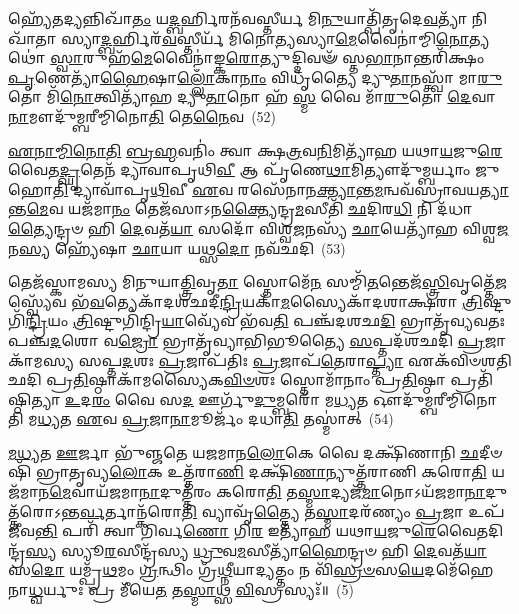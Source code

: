 𑌹𑍍𑌯𑍇᳴𑌤𑌦𑍍𑌯𑌨𑍍𑌨𑌿𑌖𑌾᳴\-\ul{𑌤𑌂} 𑌯\-\ul{𑌦𑍍𑌬}\-𑌰𑍍\mbox{}𑌹𑌿𑌰𑌨᳴𑌵𑌸𑍍𑌤𑍀𑌰𑍍𑌯 𑌮𑌿\-\ul{𑌨𑍁}\-𑌯𑌾𑌤𑍍𑌪𑌿᳴𑌤𑍃𑌦𑍇\-\ul{𑌵}\-𑌤𑍍𑌯𑌾᳴ 𑌨𑌿𑌖𑌾᳴𑌤𑌾 𑌸𑍍𑌯𑌾\-\ul{𑌦𑍍𑌬}\-𑌰𑍍\mbox{}𑌹𑌿𑌰᳴\-\ul{𑌵}\-𑌸𑍍𑌤𑍀𑌰𑍍𑌯᳴ 𑌮𑌿𑌨𑍋\-\ul{𑌤𑍍𑌯}\-𑌸𑍍𑌯𑌾\-\ul{𑌮𑍇}\-𑌵𑍈𑌨𑌾॑𑌮𑍍𑌮𑌿\-\ul{𑌨𑍋}\-𑌤𑍍𑌯𑌥𑍋॑ \ul{𑌸𑍍𑌵𑌾}\-𑌰𑍁𑌹᳴\-\ul{𑌮𑍇}\-𑌵𑍈𑌨𑌾॑𑌙𑍍𑌕\-\ul{𑌰𑍋}\-𑌤𑍍𑌯𑍁𑌦𑍍𑌦𑌿𑌵𑍟᳴ 𑌸𑍍𑌤\-\ul{𑌭𑌾}\-𑌨𑌾𑌨𑍍𑌤𑌰𑌿᳴𑌕𑍍𑌷𑌂 \ul{𑌪𑍃}\-𑌣𑍇𑌤𑍍𑌯𑌾᳴\-\ul{𑌹𑍈}\-𑌷𑌾\-\ul{𑌲𑍍𑌲𑍋𑌁}\-𑌕𑌾\-\ul{𑌨𑌾𑌂} 𑌵𑌿𑌧𑍃᳴𑌤𑍍𑌯𑍈 𑌦𑍍𑌯𑍁\-\ul{𑌤𑌾}\-𑌨𑌸𑍍𑌤𑍍𑌵𑌾᳴ 𑌮𑌾\-\ul{𑌰𑍁}\-𑌤𑍋 𑌮𑌿᳴\-\ul{𑌨𑍋}\-𑌤𑍍𑌵𑌿𑌤𑍍𑌯𑌾᳴𑌹 𑌦𑍍𑌯𑍁\-\ul{𑌤𑌾}\-𑌨𑍋 𑌹᳴ \ul{𑌸𑍍𑌮} 𑌵𑍈 𑌮𑌾᳴\-\ul{𑌰𑍁}\-𑌤𑍋 \ul{𑌦𑍇}\-𑌵𑌾\-\ul{𑌨𑌾}\-𑌮𑍗𑌦𑍁᳴𑌮𑍍𑌬𑌰𑍀𑌮𑍍𑌮𑌿𑌨𑍋\-\ul{𑌤𑌿} 𑌤𑍇\-\ul{𑌨𑍈}\-𑌵~(52)

\-\ul{𑌏}\-\-\ul{𑌨𑌾}\-\-\ul{𑌮𑍍𑌮𑌿}\-\-\ul{𑌨𑍋}\-\-\ul{𑌤𑌿} \ul{𑌬𑍍𑌰}\-\-\ul{𑌹𑍍𑌮}\-𑌵𑌨𑌿𑌂॑ 𑌤𑍍𑌵𑌾 𑌕𑍍𑌷\-\ul{𑌤𑍍𑌰}\-𑌵\-\ul{𑌨𑌿}\-𑌮𑌿𑌤𑍍𑌯𑌾᳴𑌹 𑌯𑌥𑌾\-\ul{𑌯}\-𑌜𑍁\-\ul{𑌰𑍇}\-𑌵𑍈𑌤\-\ul{𑌦𑍍𑌘𑍃}\-𑌤𑍇𑌨᳴ 𑌦𑍍𑌯𑌾𑌵𑌾𑌪𑍃𑌥𑌿\-\ul{𑌵𑍀} 𑌆 𑌪𑍃᳴𑌣𑍇\-\ul{𑌥𑌾}\-𑌮𑌿𑌤𑍍𑌯𑍗𑌦𑍁᳴𑌮𑍍𑌬𑌰𑍍𑌯𑌾𑌂 𑌜𑍁𑌹𑍋\-\ul{𑌤𑌿} 𑌦𑍍𑌯𑌾𑌵𑌾᳴𑌪𑍃\-\ul{𑌥𑌿}\-𑌵𑍀 \ul{𑌏}\-𑌵 𑌰𑌸𑍇᳴𑌨𑌾𑌨\-\ul{𑌕𑍍𑌤𑍍𑌯𑌾}\-𑌨𑍍𑌤\-\ul{𑌮}\-𑌨𑍍𑌵𑌵᳴𑌸𑍍𑌰𑌾𑌵𑌯\-\ul{𑌤𑍍𑌯𑌾}\-𑌨𑍍𑌤\-\ul{𑌮𑍇}\-𑌵 𑌯𑌜᳴𑌮𑌾\-\ul{𑌨𑌂} 𑌤𑍇𑌜᳴𑌸𑌾\-𑌽𑌨\-\ul{𑌕𑍍𑌤𑍍𑌯𑍈}\-𑌨𑍍𑌦𑍍𑌰\-\ul{𑌮}\-𑌸𑍀𑌤𑌿᳴ \ul{𑌛}\-𑌦𑌿𑌰\-\ul{𑌧𑌿} 𑌨𑌿 𑌦᳴𑌧𑌾\-\ul{𑌤𑍍𑌯𑍈}\-𑌨𑍍𑌦𑍍𑌰𑍞 𑌹𑌿 \ul{𑌦𑍇}\-𑌵𑌤᳴\-\ul{𑌯𑌾} 𑌸𑌦𑍋᳴ 𑌵𑌿𑌶𑍍𑌵\-\ul{𑌜}\-𑌨𑌸𑍍𑌯᳴ \ul{𑌛𑌾}\-𑌯𑍇𑌤𑍍𑌯𑌾᳴𑌹 𑌵𑌿𑌶𑍍𑌵\-\ul{𑌜}\-𑌨\-\ul{𑌸𑍍𑌯} 𑌹𑍍𑌯𑍇᳴𑌷𑌾 \ul{𑌛𑌾}\-𑌯𑌾 𑌯𑌥𑍍𑌸\-\ul{𑌦𑍋} 𑌨𑌵᳴𑌛𑌦𑌿~(53)

𑌤𑍇𑌜᳴𑌸𑍍𑌕𑌾𑌮𑌸𑍍𑌯 𑌮𑌿𑌨𑍁𑌯𑌾\-\ul{𑌤𑍍𑌤𑍍𑌰𑌿}\-𑌵𑍃\-\ul{𑌤𑌾} 𑌸𑍍𑌤𑍋𑌮𑍇᳴\-\ul{𑌨} 𑌸𑌮𑍍𑌮𑌿᳴\-\ul{𑌤}\-𑌨𑍍𑌤𑍇𑌜᳴\-\ul{𑌸𑍍𑌤𑍍𑌰𑌿}\-𑌵𑍃𑌤𑍍𑌤𑍇᳴\-\ul{𑌜}\-𑌸𑍍𑌵𑍍𑌯𑍇᳴𑌵 𑌭᳴\-\ul{𑌵}\-𑌤𑍍𑌯𑍇𑌕𑌾᳴\-𑌦𑌶𑌛𑌦𑍀\-\ul{𑌨𑍍𑌦𑍍𑌰𑌿}\-𑌯𑌕𑌾᳴\-\ul{𑌮}\-𑌸𑍍𑌯𑍈𑌕𑌾᳴\-𑌦𑌶𑌾𑌕𑍍𑌷𑌰𑌾 \ul{𑌤𑍍𑌰𑌿}\-𑌷𑍍𑌟𑍁𑌗𑌿᳴\-\ul{𑌨𑍍𑌦𑍍𑌰𑌿}\-𑌯𑌂 \ul{𑌤𑍍𑌰𑌿}\-𑌷𑍍𑌟𑍁𑌗𑌿᳴𑌨𑍍𑌦𑍍𑌰𑌿\-\ul{𑌯𑌾}\-𑌵𑍍𑌯𑍇᳴𑌵 𑌭᳴𑌵\-\ul{𑌤𑌿} 𑌪𑌞𑍍𑌚᳴𑌦𑌶𑌛\-\ul{𑌦𑌿} 𑌭𑍍𑌰𑌾𑌤𑍃᳴𑌵𑍍𑌯𑌵𑌤𑌃 𑌪𑌞𑍍𑌚\-\ul{𑌦}\-𑌶𑍋 𑌵\-\ul{𑌜𑍍𑌰𑍋} 𑌭𑍍𑌰𑌾𑌤𑍃᳴𑌵𑍍𑌯𑌾𑌭𑌿𑌭𑍂𑌤𑍍𑌯𑍈 \ul{𑌸}\-𑌪𑍍𑌤𑌦᳴𑌶𑌛𑌦𑌿 \ul{𑌪𑍍𑌰}\-𑌜𑌾𑌕𑌾᳴𑌮𑌸𑍍𑌯 𑌸𑌪𑍍𑌤\-\ul{𑌦}\-𑌶𑌃 \ul{𑌪𑍍𑌰}\-𑌜𑌾𑌪᳴𑌤𑌿𑌃 \ul{𑌪𑍍𑌰}\-𑌜𑌾𑌪᳴\-\ul{𑌤𑍇}\-𑌰𑌾\-\ul{𑌪𑍍𑌤𑍍𑌯𑌾} 𑌏𑌕᳴𑌵𑌿𑍞𑌶𑌤𑌿𑌛𑌦𑌿 𑌪𑍍𑌰\-\ul{𑌤𑌿}\-𑌷𑍍𑌠𑌾𑌕𑌾᳴𑌮𑌸𑍍𑌯𑍈𑌕\-\ul{𑌵𑌿}\-\-\ul{𑍞}\-𑌶𑌃 𑌸𑍍𑌤𑍋𑌮𑌾᳴𑌨𑌾𑌂 𑌪𑍍𑌰\-\ul{𑌤𑌿}\-𑌷𑍍𑌠𑌾 𑌪𑍍𑌰𑌤𑌿᳴𑌷𑍍𑌠𑌿𑌤𑍍𑌯𑌾 \ul{𑌉}\-𑌦\-\ul{𑌰𑌂} 𑌵𑍈 𑌸\-\ul{𑌦} 𑌊𑌰𑍍𑌗𑍁᳴\-\ul{𑌦𑍁}\-𑌮𑍍𑌬𑌰𑍋᳴ 𑌮\-\ul{𑌧𑍍𑌯}\-𑌤 𑌔𑌦𑍁᳴𑌮𑍍𑌬𑌰𑍀𑌮𑍍𑌮𑌿𑌨𑍋𑌤𑌿 𑌮\-\ul{𑌧𑍍𑌯}\-𑌤 \ul{𑌏}\-𑌵 \ul{𑌪𑍍𑌰}\-𑌜𑌾\-\ul{𑌨𑌾}\-𑌮𑍂𑌰𑍍𑌜𑌂᳴ 𑌦𑌧𑌾\-\ul{𑌤𑌿} 𑌤𑌸𑍍𑌮𑌾॑𑌤𑍍~(54)

\-\ul{𑌮}\-\-\ul{𑌧𑍍𑌯}\-𑌤 \ul{𑌊}\-𑌰𑍍𑌜𑌾 𑌭𑍁᳴𑌞𑍍𑌜𑌤𑍇 𑌯𑌜𑌮𑌾𑌨\-\ul{𑌲𑍋}\-𑌕𑍇 𑌵𑍈 𑌦𑌕𑍍𑌷𑌿᳴𑌣𑌾𑌨𑌿 \ul{𑌛}\-𑌦𑍀𑍞𑌷𑌿᳴ 𑌭𑍍𑌰𑌾𑌤𑍃𑌵𑍍𑌯\-\ul{𑌲𑍋}\-𑌕 𑌉𑌤𑍍𑌤᳴𑌰𑌾\-\ul{𑌣𑌿} 𑌦𑌕𑍍𑌷𑌿᳴\-\ul{𑌣𑌾}\-𑌨𑍍𑌯𑍁𑌤𑍍𑌤᳴𑌰𑌾𑌣𑌿 𑌕𑌰𑍋\-\ul{𑌤𑌿} 𑌯𑌜᳴𑌮𑌾𑌨\-\ul{𑌮𑍇}\-𑌵𑌾𑌯᳴𑌜𑌮𑌾\-\ul{𑌨𑌾}\-𑌦𑍁𑌤𑍍𑌤᳴𑌰𑌂 𑌕𑌰𑍋\-\ul{𑌤𑌿} 𑌤\-\ul{𑌸𑍍𑌮𑌾}\-𑌦𑍍𑌯𑌜᳴\-\ul{𑌮𑌾}\-𑌨𑍋\-𑌽𑌯᳴𑌜𑌮𑌾\-\ul{𑌨𑌾}\-𑌦𑍁𑌤𑍍𑌤᳴𑌰𑍋\-𑌽𑌨𑍍𑌤\-\ul{𑌰𑍍𑌵}\-𑌰𑍍𑌤𑌾𑌨𑍍𑌕᳴𑌰𑍋\-\ul{𑌤𑌿} 𑌵𑍍𑌯𑌾𑌵𑍃᳴\-\ul{𑌤𑍍𑌤𑍍𑌯𑍈} 𑌤\-\ul{𑌸𑍍𑌮𑌾}\-𑌦𑌰᳴𑌣𑍍𑌯𑌂 \ul{𑌪𑍍𑌰}\-𑌜𑌾 𑌉𑌪᳴ 𑌜𑍀𑌵\-\ul{𑌨𑍍𑌤𑌿} 𑌪𑌰𑌿᳴ 𑌤𑍍𑌵𑌾 𑌗𑌿𑌰𑍍𑌵\-\ul{𑌣𑍋} 𑌗𑌿\-\ul{𑌰} 𑌇𑌤𑍍𑌯𑌾᳴𑌹 𑌯𑌥𑌾\-\ul{𑌯}\-𑌜𑍁\-\ul{𑌰𑍇}\-𑌵𑍈𑌤𑌦𑌿𑌨𑍍𑌦𑍍𑌰᳴\-\ul{𑌸𑍍𑌯} 𑌸𑍍𑌯𑍂\-\ul{𑌰}\-𑌸𑍀𑌨𑍍𑌦𑍍𑌰᳴𑌸𑍍𑌯 \ul{𑌧𑍍𑌰𑍁}\-𑌵\-\ul{𑌮}\-𑌸𑍀𑌤𑍍𑌯𑌾᳴\-\ul{𑌹𑍈}\-𑌨𑍍𑌦𑍍𑌰𑍞 𑌹𑌿 \ul{𑌦𑍇}\-𑌵𑌤᳴\-\ul{𑌯𑌾} 𑌸\-\ul{𑌦𑍋} 𑌯𑌮𑍍𑌪𑍍𑌰᳴\-\ul{𑌥}\-𑌮𑌂 \ul{𑌗𑍍𑌰}\-𑌨𑍍𑌥𑌿𑌂 𑌗𑍍𑌰᳴\-\ul{𑌥𑍍𑌨𑍀}\-𑌯𑌾𑌦𑍍𑌯𑌤𑍍𑌤𑌂 𑌨 𑌵𑌿᳴\-\ul{𑌸𑍍𑌰}\-\-\ul{𑍞}\-𑌸\-\ul{𑌯𑍇}\-𑌦𑌮𑍇᳴𑌹𑍇𑌨𑌾\-\ul{𑌧𑍍𑌵}\-𑌰𑍍𑌯𑍁𑌃 𑌪𑍍𑌰 𑌮𑍀᳴𑌯𑍇\-\ul{𑌤} 𑌤\-\ul{𑌸𑍍𑌮𑌾}\-𑌥𑍍𑌸 \ul{𑌵𑌿}\-𑌸𑍍𑌰𑌸𑍍𑌯𑌃᳴॥~(5)

